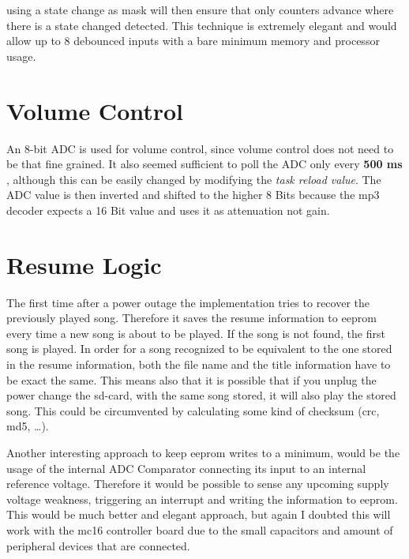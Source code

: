 \documentclass[12pt,a4paper,titlepage,oneside]{article}
\begin{document}
using a state change as mask will then ensure that only counters advance where there is a state changed detected. This technique is extremely elegant and would allow up to 8 debounced inputs with a bare minimum memory and processor usage.

\section{Volume Control}

An 8-bit ADC is used for volume control, since volume control does not need to be that fine grained. It also seemed sufficient to poll the ADC only every {\bf 500 ms }, although this can be easily changed by modifying the {\it task reload value}. The ADC value is then inverted and shifted to the higher 8 Bits because the mp3 decoder expects a 16 Bit value and uses it as attenuation not gain. 

\section{Resume Logic}

The first time after a power outage the implementation tries to recover the previously played song. Therefore it saves the resume information to eeprom every time a new song is about to be played. If the song is not found, the first song is played. In order for a song recognized to be equivalent to the one stored in the resume information, both the file name and the title information have to be exact the same. This means also that it is possible that if you unplug the power change the sd-card, with the same song stored, it will also play the stored song. This could be circumvented by calculating some kind of checksum (crc, md5, \dots ).

Another interesting approach to keep eeprom writes to a minimum, would be the usage of the internal ADC Comparator connecting its input to an internal reference voltage. Therefore it would be possible to sense any upcoming supply voltage weakness, triggering an interrupt and writing the information to eeprom. This would be much better and elegant approach, but again I doubted this will work with the mc16 controller board due to the small capacitors and amount of peripheral devices that are connected.
\end{document}
